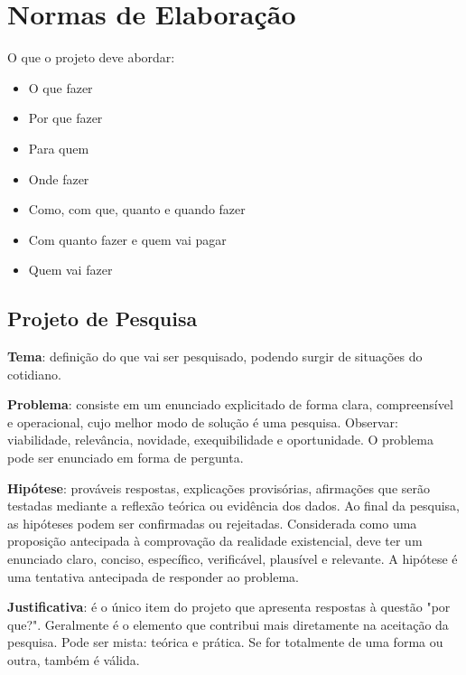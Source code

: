 \section[Short]{Normas de Elaboração}

    O que o projeto deve abordar:
    \begin{itemize}
        \item O que fazer
        \item Por que fazer
        \item Para quem
        \item Onde fazer
        \item Como, com que, quanto e quando fazer
        \item Com quanto fazer e quem vai pagar
        \item Quem vai fazer
    \end{itemize}

    \subsection{Projeto de Pesquisa}

        \indent \textbf{Tema}: definição do que vai ser pesquisado, podendo surgir de situações do cotidiano.

        \textbf{Problema}: consiste em um enunciado explicitado de forma clara, compreensível e operacional, cujo melhor modo de solução é uma pesquisa. Observar: viabilidade, relevância, novidade, exequibilidade e oportunidade. O problema pode ser enunciado em forma de pergunta.

        \textbf{Hipótese}: prováveis respostas, explicações provisórias, afirmações que serão testadas mediante a reflexão teórica ou evidência dos dados. Ao final da pesquisa, as hipóteses podem ser confirmadas ou rejeitadas. Considerada como uma proposição antecipada à comprovação da realidade existencial, deve ter um enunciado claro, conciso, específico, verificável, plausível e relevante. A hipótese é uma tentativa antecipada de responder ao problema.

        \textbf{Justificativa}: é o único item do projeto que apresenta respostas à questão "por que?". Geralmente é o elemento que contribui mais diretamente na aceitação da pesquisa. Pode ser mista: teórica e prática. Se for totalmente de uma forma ou outra, também é válida.

